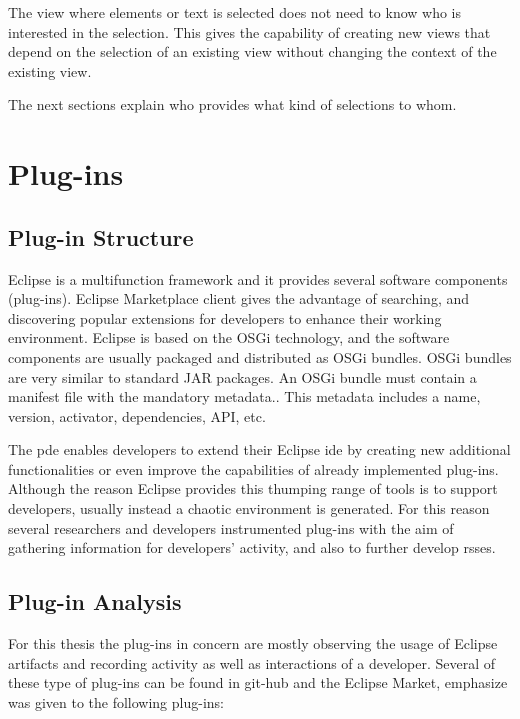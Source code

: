 The view where elements or text is selected does not need to know who is interested in the selection. This gives the capability of creating new views that depend on the selection of an existing view without changing the context of the existing view.

The next sections explain who provides what kind of selections to whom.




\section{Plug-ins}
\label{sec:TheEclipseIDE:plug-ins}

\subsection{Plug-in Structure}
Eclipse is a multifunction framework and it provides several software components (plug-ins). Eclipse Marketplace client gives the advantage of searching, and discovering popular extensions for developers to enhance their working environment. Eclipse is based on the OSGi technology, and the software components are usually packaged and distributed as OSGi bundles. OSGi bundles are very similar to standard JAR packages. An OSGi bundle must contain a manifest file with the mandatory metadata.. This metadata includes a name, version, activator, dependencies, API, etc. 

The \gls{pde} enables developers to extend their Eclipse \gls{ide} by creating new additional functionalities or even improve the capabilities of already implemented plug-ins. Although the reason Eclipse provides this thumping range of tools is to support developers, usually instead a chaotic environment is generated. For this reason several researchers and developers instrumented plug-ins with the aim of gathering information for developers' activity, and also to further develop \gls{rsse}s.

\subsection{Plug-in Analysis}

For this thesis the plug-ins in concern are mostly observing the usage of Eclipse artifacts and 
recording activity as well as interactions of a developer. 
Several of these type of plug-ins can be found in git-hub and the Eclipse Market, emphasize was given
to the following plug-ins:

